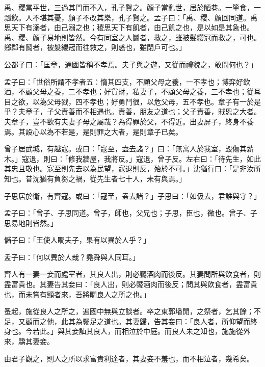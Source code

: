 \documentclass[12pt,a4paper]{ctexbook}
\begin{document}
禹、稷當平世，三過其門而不入，孔子賢之。顏子當亂世，居於陋巷。一簞食，一瓢飲。人不堪其憂，顏子不改其樂，孔子賢之。孟子曰：「禹、稷、顏回同道。禹思天下有溺者，由己溺之也；稷思天下有飢者，由己飢之也，是以如是其急也。禹、稷、顏子易地則皆然。今有同室之人鬬者，救之，雖被髮纓冠而救之，可也。鄉鄰有鬬者，被髮纓冠而往救之，則惑也，雖閉戶可也。」\par
公都子曰：「匡章，通國皆稱不孝焉。夫子與之遊，又從而禮貌之，敢問何也？」\par
孟子曰：「世俗所謂不孝者五：惰其四支，不顧父母之養，一不孝也；博弈好飲酒，不顧父母之養，二不孝也；好貨財，私妻子，不顧父母之養，三不孝也；從耳目之欲，以為父母戮，四不孝也；好勇鬥很，以危父母，五不孝也。章子有一於是乎？夫章子，子父責善而不相遇也。責善，朋友之道也；父子責善，賊恩之大者。夫章子，豈不欲有夫妻子母之屬哉？為得罪於父，不得近。出妻屏子，終身不養焉。其設心以為不若是，是則罪之大者，是則章子已矣。\par
曾子居武城，有越寇。或曰：「寇至，盍去諸？」曰：「無寓人於我室，毀傷其薪木。」寇退，則曰：「修我牆屋，我將反。」寇退，曾子反。左右曰：「待先生，如此其忠且敬也。寇至則先去以為民望，寇退則反，殆於不可。」沈猶行曰：「是非汝所知也。昔沈猶有負芻之禍，從先生者七十人，未有與焉。」\par
子思居於衛，有齊寇。或曰：「寇至，盍去諸？」子思曰：「如伋去，君誰與守？」\par
孟子曰：「曾子、子思同道。曾子，師也，父兄也；子思，臣也，微也。曾子、子思易地則皆然。」\par
儲子曰：「王使人瞷夫子，果有以異於人乎？」\par
孟子曰：「何以異於人哉？堯舜與人同耳。」\par
齊人有一妻一妾而處室者，其良人出，則必饜酒肉而後反。其妻問所與飲食者，則盡富貴也。其妻告其妾曰：「良人出，則必饜酒肉而後反；問其與飲食者，盡富貴也，而未嘗有顯者來，吾將瞷良人之所之也。」\par
蚤起，施從良人之所之，遍國中無與立談者。卒之東郭墦閒，之祭者，乞其餘；不足，又顧而之他，此其為饜足之道也。其妻歸，告其妾曰：「良人者，所仰望而終身也。今若此。」與其妾訕其良人，而相泣於中庭。而良人未之知也，施施從外來，驕其妻妾。\par
由君子觀之，則人之所以求富貴利達者，其妻妾不羞也，而不相泣者，幾希矣。\par
\end{document}
